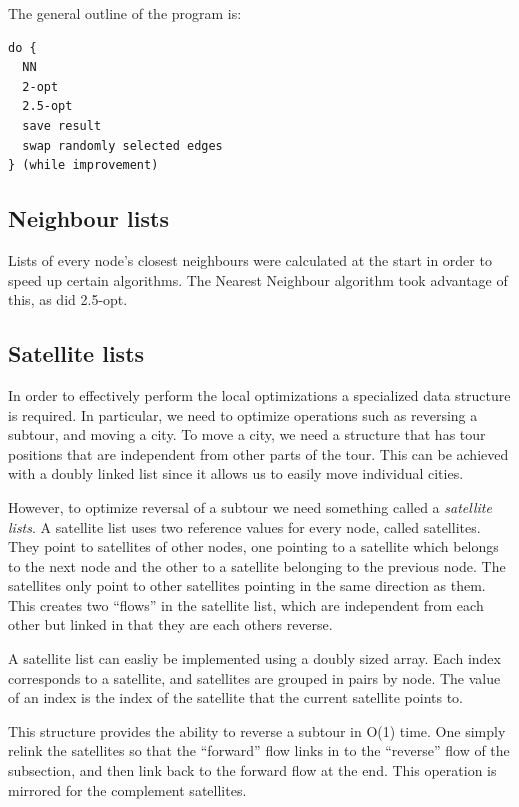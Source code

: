 \documentclass[paper=a4, fontsize=11pt,numbers=endperiod]{scrartcl} %
\numberwithin{equation}{section} %
\numberwithin{figure}{section} %
\numberwithin{table}{section} %
\begin{document}
The general outline of the program is:

\begin{verbatim}
do {
  NN
  2-opt
  2.5-opt
  save result
  swap randomly selected edges
} (while improvement)
\end{verbatim}


\subsection{Neighbour lists}
Lists of every node's closest neighbours were calculated at the start in order to speed up certain algorithms.
The Nearest Neighbour algorithm took advantage of this, as did 2.5-opt.

\subsection{Satellite lists}
In order to effectively perform the local optimizations a specialized data structure is required.
In particular, we need to optimize operations such as reversing a subtour, and moving a city.
To move a city, we need a structure that has tour positions that are independent from other parts of the tour.
This can be achieved with a doubly linked list since it allows us to easily move individual cities.

However, to optimize reversal of a subtour we need something called a \emph{satellite lists}.\cite{satellite}
A satellite list uses two reference values for every node, called satellites.
They point to satellites of other nodes, one pointing to a satellite which belongs to the next node and the other to a satellite belonging to the previous node.
The satellites only point to other satellites pointing in the same direction as them.
This creates two ``flows'' in the satellite list, which are independent from each other but linked in that they are each others reverse.

A satellite list can easliy be implemented using a doubly sized array.
Each index corresponds to a satellite, and satellites are grouped in pairs by node.
The value of an index is the index of the satellite that the current satellite points to.

This structure provides the ability to reverse a subtour in O(1) time.
One simply relink the satellites so that the ``forward'' flow links in to the ``reverse'' flow of the subsection, and then link back to the forward flow at the end.
This operation is mirrored for the complement satellites.
\end{document}
